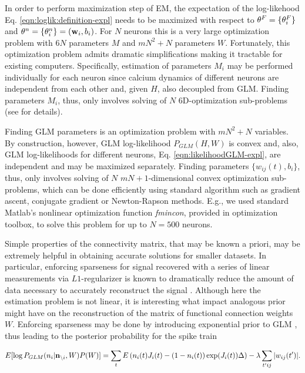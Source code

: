In order to perform maximization step of EM, the expectation of the log-likehood  Eq. \eqref{eqn:loglik:definition-expl} needs to be maximized with respect to $\mathbf{\theta}^F=\{\mathbf{\theta}^F_i\}$ and $\mathbf{\theta}^n = \{\mathbf{\theta}^n_i\} = (\mathbf{w}_i, b_i)$. For $N$ neurons this is a very large optimization problem with $6N$ parameters $M$ and $m N^2 + N$ parameters $W$.  Fortunately, this optimization problem admits dramatic simplifications making it tractable for existing computers.  Specifically, estimation of parameters $M_i$ may be performed individually for each neuron since calcium dynamics of different neurons are independent from each other and, given $H$, also decoupled from GLM. Finding parameters $M_i$, thus, only involves solving of $N$ 6D-optimization sub-problems (see \cite{Vogelstein2009} for details).

Finding GLM parameters is an optimization problem with $mN^2+N$ variables. By construction, however, GLM log-likelihood $P_{GLM}(H, W)$ is convex and, also, GLM log-likelihoods for different neurons, Eq. \eqref{eqn:likelihoodGLM-expl}, are independent and may be maximized separately. Finding parameters $\{w_{ij}(t), b_i\}$, thus, only involves solving of $N$ $mN+1$-dimensional convex optimization sub-problems, which can be done efficiently using standard algorithm such as gradient ascent, conjugate gradient or Newton-Rapson methods. E.g., we used standard Matlab's nonlinear optimization function {\em fmincon}, provided in optimization toolbox, to solve this problem for up to $N=500$ neurons.

Simple properties of the connectivity matrix, that may be known a priori, may be extremely helpful in obtaining accurate solutions for smaller datasets. In particular, enforcing sparseness for signal recovered with a series of linear measurements via $L1$-regularizer is known to dramatically reduce the amount of data necessary to accurately reconstruct the signal \cite{Candes2005, DE03, Mishchenko2009}. Although here the estimation problem is not linear, it is interesting what impact analogous prior might have on the reconstruction of the matrix of functional connection weights $W$. Enforcing sparseness may be done by introducing exponential prior to GLM \cite{Stevenson2009}, thus leading to the posterior probability for the spike train

\begin{equation}\label{eqn:likelihoodsparseGLM}
E[\log P_{GLM}(n_i|{\bf n}_{\backslash i}, W)P(W)]=\sum_t E\left( n_i(t) J_i(t) - (1-n_i(t)) \exp(J_i(t)) \Delta \right)-\lambda \sum_{t'ij}|w_{ij}(t')|.
\end{equation}

